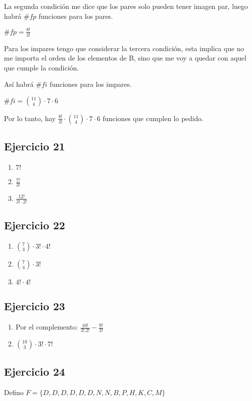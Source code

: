 La segunda condición me dice que los pares solo pueden tener imagen par, luego habrá $ \#fp $ funciones para los pares.

$ \#fp = \frac{8!}{3!} $

Para los impares tengo que considerar la tercera condición, esta implica que no me importa el orden de los elementos de B, sino que me voy a quedar con aquel que cumple la condición.

Así habrá $\#fi$ funciones para los impares.

$\#fi = \binom{11}{4} \cdot 7 \cdot 6$

Por lo tanto, hay $ \frac{8!}{3!} \cdot \binom{11}{4} \cdot 7 \cdot 6 $ funciones que cumplen lo pedido.

\subsection{Ejercicio 21}
\begin{enumerate}
    \item $ 7! $
    \item $ \frac{7!}{3!} $
    \item $ \frac{12!}{3!\cdot 2!} $
\end{enumerate}

\subsection{Ejercicio 22}
\begin{enumerate}
    \item $ \binom{7}{3} \cdot 3! \cdot 4! $
    \item $ \binom{7}{4} \cdot 3! $
    \item $ 4! \cdot 4! $
\end{enumerate}

\subsection{Ejercicio 23}
\begin{enumerate}
    \item Por el complemento: $ \frac{10!}{3! . 2!} - \frac{9!}{3!}$
    \item $ \binom{10}{3} \cdot 3! \cdot 7!$
\end{enumerate}

\subsection{Ejercicio 24}
Defino $ F = \{ D,D,D,D,D,D,N,N,B,P,H,K,C,M \} $

